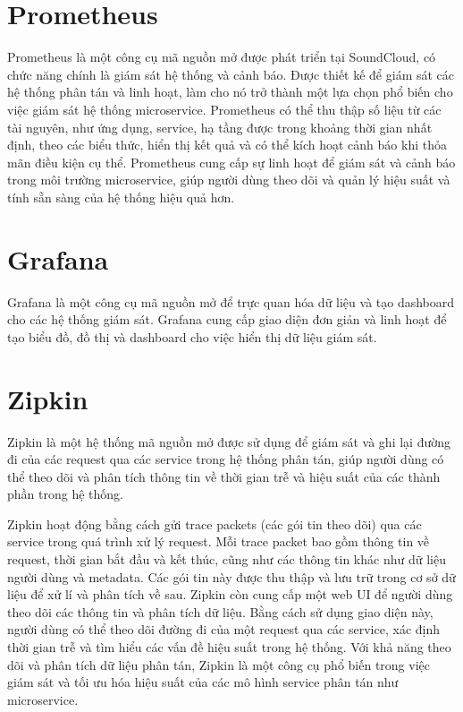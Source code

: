 \documentclass[report.tex]{subfiles}
\begin{document}
\section{Prometheus}

Prometheus là một công cụ mã nguồn mở được phát triển tại SoundCloud, có chức năng chính là giám sát hệ thống và cảnh báo.
Được thiết kế để giám sát các hệ thống phân tán và linh hoạt, làm cho nó trở thành một lựa chọn phổ biến cho việc giám sát hệ thống microservice.
\newline
Prometheus có thể thu thập số liệu từ các tài nguyên, như ứng dụng, service, hạ tầng được trong khoảng thời gian nhất định,
theo các biểu thức, hiển thị kết quả và có thể kích hoạt cảnh báo khi thỏa mãn điều kiện cụ thể.
\newline
Prometheus cung cấp sự linh hoạt để giám sát và cảnh báo trong môi trường microservice, giúp người dùng theo dõi và quản lý hiệu suất và tính sẵn sàng của hệ thống hiệu quả hơn.

\section{Grafana}

Grafana là một công cụ mã nguồn mở để trực quan hóa dữ liệu và tạo dashboard cho các hệ thống giám sát.
Grafana cung cấp giao diện đơn giản và linh hoạt để tạo biểu đồ, đồ thị và dashboard cho việc hiển thị dữ liệu giám sát.

\section{Zipkin}

Zipkin là một hệ thống mã nguồn mở được sử dụng để giám sát và ghi lại đường đi của các request qua các service trong hệ thống phân tán, giúp người dùng có thể theo dõi và phân tích thông tin về thời gian trễ và hiệu suất của các thành phần trong hệ thống.

Zipkin hoạt động bằng cách gửi trace packets (các gói tin theo dõi) qua các service trong quá trình xử lý request.
Mỗi trace packet bao gồm thông tin về request, thời gian bắt đầu và kết thúc, cũng như các thông tin khác như dữ liệu người dùng và metadata.
Các gói tin này được thu thập và lưu trữ trong cơ sở dữ liệu để xử lí và phân tích về sau.
\newline
Zipkin còn cung cấp một web UI để người dùng theo dõi các thông tin và phân tích dữ liệu.
Bằng cách sử dụng giao diện này, người dùng có thể theo dõi đường đi của một request qua các service, xác định thời gian trễ và tìm hiểu các vấn đề hiệu suất trong hệ thống.
\newline
Với khả năng theo dõi và phân tích dữ liệu phân tán, Zipkin là một công cụ phổ biến trong việc giám sát và tối ưu hóa hiệu suất của các mô hình service phân tán như microservice.
\end{document}
